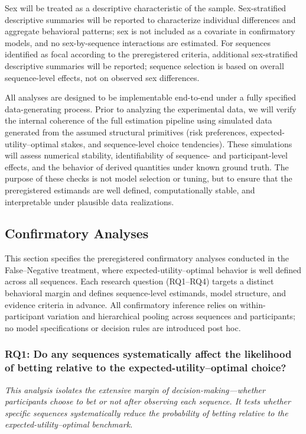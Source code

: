 \documentclass[11pt,a4paper]{article}
\numberwithin{equation}{section}
\begin{document}
Sex will be treated as a descriptive characteristic of the sample. Sex-stratified descriptive summaries will be reported to characterize individual differences and aggregate behavioral patterns; sex is not included as a covariate in confirmatory models, and no sex-by-sequence interactions are estimated. For sequences identified as focal according to the preregistered criteria, additional sex-stratified descriptive summaries will be reported; sequence selection is based on overall sequence-level effects, not on observed sex differences.

All analyses are designed to be implementable end-to-end under a fully specified
data-generating process. Prior to analyzing the experimental data, we will verify
the internal coherence of the full estimation pipeline using simulated data generated
from the assumed structural primitives (risk preferences, expected-utility–optimal
stakes, and sequence-level choice tendencies). These simulations will assess numerical
stability, identifiability of sequence- and participant-level effects, and the
behavior of derived quantities under known ground truth. The purpose of these checks
is not model selection or tuning, but to ensure that the preregistered estimands are
well defined, computationally stable, and interpretable under plausible data
realizations.

\subsection{Confirmatory Analyses}
\label{Sec:Confirmatory}
This section specifies the preregistered confirmatory analyses conducted in the False--Negative treatment, where expected-utility–optimal behavior is well defined across all sequences. Each research question (RQ1--RQ4) targets a distinct behavioral margin and defines sequence-level estimands, model structure, and evidence criteria in advance. All confirmatory inference relies on within-participant variation and hierarchical pooling across sequences and participants; no model specifications or decision rules are introduced post hoc.

\subsubsection{RQ1: Do any sequences systematically affect the likelihood of betting relative to the expected-utility--optimal choice?}
\label{Sec:Rq1}

\textit{This analysis isolates the extensive margin of decision-making---whether 
	participants choose to bet or not after observing each sequence. It tests whether 
	specific sequences systematically reduce the probability of betting relative to the 
	expected-utility--optimal benchmark.}
\end{document}
